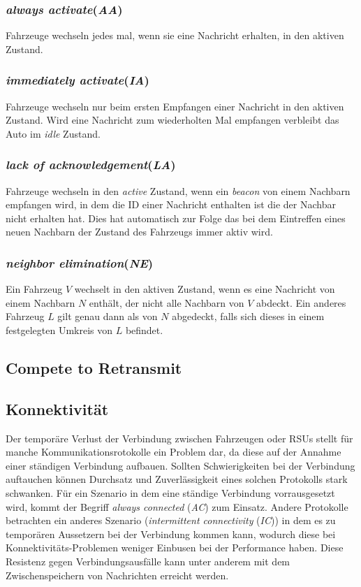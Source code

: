 \documentclass[english,runningheads,a4paper]{llncs}[2018/03/10]
\begin{document}
\subsubsection{\textit{always activate}(\textit{AA})}
Fahrzeuge wechseln jedes mal, wenn sie eine Nachricht erhalten, in den aktiven Zustand.
\subsubsection{\textit{immediately activate}(\textit{IA})}
Fahrzeuge wechseln nur beim ersten Empfangen einer Nachricht in den aktiven Zustand.
Wird eine Nachricht zum wiederholten Mal empfangen verbleibt das Auto im \textit{idle} Zustand.
\subsubsection{\textit{lack of acknowledgement}(\textit{LA})}
Fahrzeuge wechseln in den \textit{active} Zustand, wenn ein \textit{beacon} von einem Nachbarn empfangen wird, in dem die ID einer Nachricht enthalten ist die der Nachbar nicht erhalten hat.
Dies hat automatisch zur Folge das bei dem Eintreffen eines neuen Nachbarn der Zustand des Fahrzeugs immer aktiv wird.
\subsubsection{\textit{neighbor elimination}(\textit{NE})}
Ein Fahrzeug $V$ wechselt in den aktiven Zustand, wenn es eine Nachricht von einem Nachbarn $N$ enthält, der nicht alle Nachbarn von $V$ abdeckt.
Ein anderes Fahrzeug $L$ gilt genau dann als von $N$ abgedeckt, falls sich dieses in einem festgelegten Umkreis von $L$ befindet.


\subsection{Compete to Retransmit}

\subsection{Konnektivität}
Der temporäre Verlust der Verbindung zwischen Fahrzeugen oder RSUs stellt für manche Kommunikationsrotokolle ein Problem dar, da diese auf der Annahme einer ständigen Verbindung aufbauen.
Sollten Schwierigkeiten bei der Verbindung auftauchen können Durchsatz und Zuverlässigkeit eines solchen Protokolls stark schwanken.
Für ein Szenario in dem eine ständige Verbindung vorrausgesetzt wird, kommt der Begriff \textit{always connected} (\textit{AC}) zum Einsatz.
Andere Protokolle betrachten ein anderes Szenario (\textit{intermittent connectivity} (\textit{IC})) in dem es zu temporären Aussetzern bei der Verbindung kommen kann, wodurch diese bei Konnektivitäts-Problemen weniger Einbusen bei der Performance haben.
Diese Resistenz gegen Verbindungsausfälle kann unter anderem mit dem Zwischenspeichern von Nachrichten erreicht werden.
\end{document}
